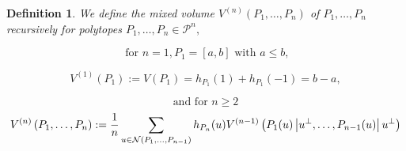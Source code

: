 \documentclass[oneside]{book}
\newtheorem{mydef}{Definition}
\begin{document}
\begin{mydef}


We define the mixed volume $V^{(n)}\left(P_{1}, \ldots, P_{n}\right)$ of $P_{1}, \ldots, P_{n}$ recursively for polytopes $P_{1}, \ldots, P_{n} \in \mathcal{P}^{n},$ 

\newline 
$$ \text{ for } n = 1, P_{1}=[a, b] \text { with } a \leq b,$$ 
    
  \begin{equation}
      V^{(1)}\left(P_{1}\right):=V\left(P_{1}\right)=h_{P_{1}}(1)+h_{P_{1}}(-1) = b - a,  
  \end{equation} 

$$\text{and} \text { for } n \geq 2 $$ 
\begin{equation}
\\
V^{(n)}\left(P_{1}, \ldots, P_{n}\right):=\frac{1}{n} \sum_{u \in \mathcal{N}\left(P_{1}, \ldots, P_{n-1}\right)} h_{P_{n}}(u) V^{(n-1)}\left(P_{1}(u)\left|u^{\perp}, \ldots, P_{n-1}(u)\right| u^{\perp}\right)
\end{equation}
  \end{mydef}     
\end{document}
